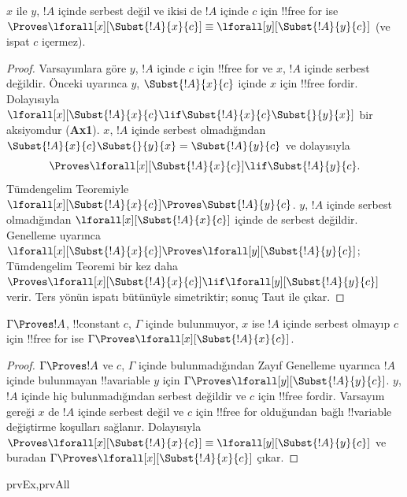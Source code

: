 \begin{lem}
$x$ ile $y$, $!A$ içinde serbest değil ve ikisi de $!A$ içinde $c$ için
!!{free for} ise
$\Proves \lforall[x][\Subst{!A}{x}{c}] \equiv
\lforall[y][\Subst{!A}{y}{c}]$ (ve ispat $c$ içermez).
\end{lem}

\begin{proof}
Varsayımlara göre $y$, $!A$ içinde $c$ için !!{free for} ve $x$, $!A$
içinde serbest değildir. Önceki  uyarınca $y$,
$\Subst{!A}{x}{c}$ içinde $x$ için !!{free for}{}dir. Dolayısıyla
$\lforall[x][\Subst{!A}{x}{c} \lif \Subst{!A}{x}{c} \Subst{}{y}{x}]$
bir aksiyomdur (\textbf{Ax1}). $x$, $!A$ içinde serbest olmadığından
$\Subst{!A}{x}{c} \Subst{}{y}{x} = \Subst{!A}{y}{c}$ ve dolayısıyla
\[
\Proves \lforall[x][\Subst{!A}{x}{c}] \lif \Subst{!A}{y}{c}.
\]
Tümdengelim Teoremiyle
$\lforall[x][\Subst{!A}{x}{c}] \Proves \Subst{!A}{y}{c}$. $y$, $!A$
içinde serbest olmadığından $\lforall[x][\Subst{!A}{x}{c}]$ içinde de
serbest değildir. Genelleme uyarınca
$\lforall[x][\Subst{!A}{x}{c}] \Proves
\lforall[y][\Subst{!A}{y}{c}]$; Tümdengelim Teoremi bir kez daha
$\Proves \lforall[x][\Subst{!A}{x}{c}] \lif
\lforall[y][\Subst{!A}{y}{c}]$ verir. Ters yönün ispatı bütünüyle
simetriktir; sonuç Taut ile çıkar.
\end{proof}

\begin{thm}
$\Gamma \Proves !A$, !!{constant} $c$, $\Gamma$ içinde bulunmuyor, $x$ ise
$!A$ içinde serbest olmayıp $c$ için !!{free for} ise
$\Gamma \Proves \lforall[x][\Subst{!A}{x}{c}]$.
\end{thm}

\begin{proof}
$\Gamma \Proves !A$ ve $c$, $\Gamma$ içinde bulunmadığından Zayıf Genelleme
uyarınca $!A$ içinde bulunmayan !!a{variable} $y$ için
$\Gamma \Proves \lforall[y][\Subst{!A}{y}{c}]$. $y$, $!A$ içinde hiç
bulunmadığından serbest değildir ve $c$ için !!{free for}{}dir. Varsayım gereği
$x$ de $!A$ içinde serbest değil ve $c$ için !!{free for} olduğundan bağlı
!!{variable} değiştirme koşulları sağlanır. Dolayısıyla
$\Proves \lforall[x][\Subst{!A}{x}{c}] \equiv
\lforall[y][\Subst{!A}{y}{c}]$ ve buradan
$\Gamma \Proves \lforall[x][\Subst{!A}{x}{c}]$ çıkar.
\end{proof}

\begin{thm}
\begin{tagenumerate}{prvEx,prvAll}
\end{tagenumerate}
\end{thm}

